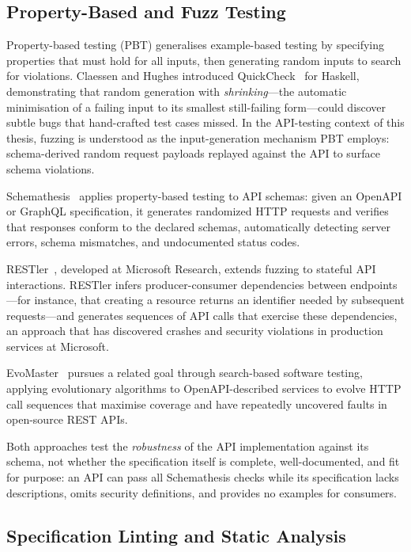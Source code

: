 \subsection{Property-Based and Fuzz Testing}
\label{subsec:pbt-fuzz}

Property-based testing (PBT) generalises example-based testing by specifying properties that must hold for all inputs, then generating random inputs to search for violations. Claessen and Hughes introduced QuickCheck~\cite{quickcheck} for Haskell, demonstrating that random generation with \emph{shrinking}---the automatic minimisation of a failing input to its smallest still-failing form---could discover subtle bugs that hand-crafted test cases missed. In the API-testing context of this thesis, fuzzing is understood as the input-generation mechanism PBT employs: schema-derived random request payloads replayed against the API to surface schema violations.

Schemathesis~\cite{schemathesis} applies property-based testing to API schemas: given an OpenAPI or GraphQL specification, it generates randomized HTTP requests and verifies that responses conform to the declared schemas, automatically detecting server errors, schema mismatches, and undocumented status codes.

RESTler~\cite{restler}, developed at Microsoft Research, extends fuzzing to stateful API interactions. RESTler infers producer-consumer dependencies between endpoints---for instance, that creating a resource returns an identifier needed by subsequent requests---and generates sequences of API calls that exercise these dependencies, an approach that has discovered crashes and security violations in production services at Microsoft.

EvoMaster~\cite{evomaster} pursues a related goal through search-based software testing, applying evolutionary algorithms to OpenAPI-described services to evolve HTTP call sequences that maximise coverage and have repeatedly uncovered faults in open-source REST APIs.

Both approaches test the \textit{robustness} of the API implementation against its schema, not whether the specification itself is complete, well-documented, and fit for purpose: an API can pass all Schemathesis checks while its specification lacks descriptions, omits security definitions, and provides no examples for consumers.

\subsection{Specification Linting and Static Analysis}
\label{subsec:spec-linting}

